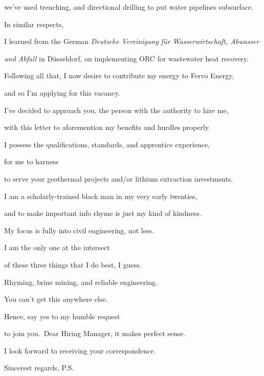 we've used trenching, and directional drilling to put water pipelines subsurface.

In similar respects,

I learned from the German \textit{Deutsche Vereinigung für Wasserwirtschaft, Abwasser}

\textit{und Abfall} in Düsseldorf, on implementing ORC for wastewater heat recovery.

Following all that, I now desire to contribute my energy to Fervo Energy,

and so I'm applying for this vacancy.

I've decided to approach you, the person with the authority to hire me,

with this letter to aforemention my benefits and hurdles properly.

I possess the qualifications, standards, and apprentice experience,

for me to harness

to serve your geothermal projects and/or lithium extraction investments.

I am a scholarly-trained black man in my very early twenties,

and to make important info rhyme is just my kind of kindness.

My focus is fully into civil engineering, not less.

I am the only one at the intersect

of these three things that I do best, I guess.

Rhyming, brine mining, and reliable engineering.

You can't get this anywhere else.

Hence, say yes to my humble request

to join you.\ Dear Hiring Manager, it makes perfect sense.

I look forward to receiving your correspondence.

Sincerest regards, P.S.